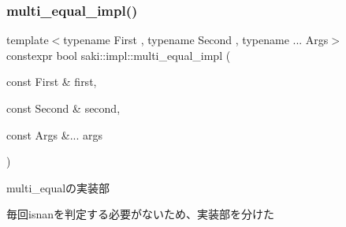 \subsubsection{\texorpdfstring{multi\+\_\+equal\+\_\+impl()}{multi\_equal\_impl()}\hspace{0.1cm}{\footnotesize\ttfamily [2/2]}}
{\footnotesize\ttfamily template$<$typename First , typename Second , typename ... Args$>$ \\
constexpr bool saki\+::impl\+::multi\+\_\+equal\+\_\+impl (\begin{DoxyParamCaption}\item[{const First \&}]{first,  }\item[{const Second \&}]{second,  }\item[{const Args \&...}]{args }\end{DoxyParamCaption})}



multi\+\_\+equalの実装部 

毎回isnanを判定する必要がないため、実装部を分けた 